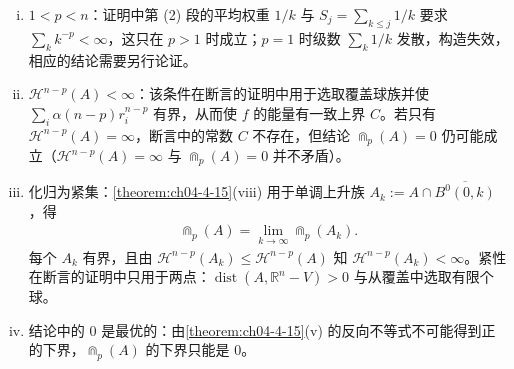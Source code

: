 \documentclass[../../main.tex]{subfiles}%
\begin{document}
\begin{remark}\label{remark:ch04-thm-4-16-条件}
\begin{enumerate}[(i)]
\item $1<p<n$：证明中第 (2) 段的平均权重 $1/k$ 与 $S_j=\sum_{k\leqslant j}1/k$ 要求 $\sum_k k^{-p}<\infty$，这只在 $p>1$ 时成立；$p=1$ 时级数 $\sum_k1/k$ 发散，构造失效，相应的结论需要另行论证。
\item $\mathcal{H}^{n-p}(A)<\infty$：该条件在断言的证明中用于选取覆盖球族并使 $\sum_i\alpha(n-p)r_i^{n-p}$ 有界，从而使 $f$ 的能量有一致上界 $C$。若只有 $\mathcal{H}^{n-p}(A)=\infty$，断言中的常数 $C$ 不存在，但结论 $\Cap_p(A)=0$ 仍可能成立（$\mathcal{H}^{n-p}(A)=\infty$ 与 $\Cap_p(A)=0$ 并不矛盾）。
\item 化归为紧集：\cref{theorem:ch04-4-15}(viii) 用于单调上升族 $A_k:=A\cap\overline{B^{0}(0,k)}$，得%
\begin{align*}
\Cap_p(A)=\lim_{k\to\infty}\Cap_p(A_k).
\end{align*}
每个 $A_k$ 有界，且由 $\mathcal{H}^{n-p}(A_k)\leqslant\mathcal{H}^{n-p}(A)$ 知 $\mathcal{H}^{n-p}(A_k)<\infty$。紧性在断言的证明中只用于两点：$\operatorname{dist}(A,\mathbb{R}^n-V)>0$ 与从覆盖中选取有限个球。
\item 结论中的 $0$ 是最优的：由\cref{theorem:ch04-4-15}(v) 的反向不等式不可能得到正的下界，$\Cap_p(A)$ 的下界只能是 $0$。%
\end{enumerate}
\end{remark}
\end{document}
